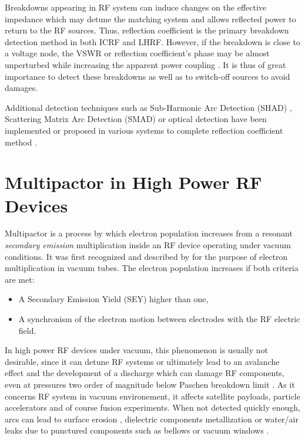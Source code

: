 Breakdowns appearing in RF system can induce changes on the effective impedance which may detune the matching system and allows reflected power to return to the RF sources. Thus, reflection coefficient is the primary breakdown detection method in both ICRF and LHRF. However, if the breakdown is close to a voltage node, the VSWR or reflection coefficient’s phase may be almost unperturbed while increasing the apparent power coupling . It is thus of great importance to detect these breakdowns as well as to switch-off sources to avoid damages. 

Additional detection techniques such as Sub-Harmonic Arc Detection (SHAD) , Scattering Matrix Arc Detection (SMAD)  or optical detection have been implemented or proposed in various systems to complete reflection coefficient method . 



\section[Multipactor in HP RF Devices]{Multipactor in High Power RF Devices}
Multipactor is a process by which electron population increases from a resonant \textit{secondary emission} multiplication inside an RF device operating under vacuum conditions. It was first recognized and described by  for the purpose of electron multiplication in vacuum tubes. The electron population increases if both criteria are met: 
\begin{itemize}
	\item A Secondary Emission Yield (SEY) higher than one,
	\item A synchronism of the electron motion between electrodes with the RF electric field.
\end{itemize}

In high power RF devices under vacuum, this phenomenon is usually not desirable, since it can detune RF systems or ultimately lead to an avalanche effect and the development of a discharge which can damage RF components, even at pressures two order of magnitude below Paschen breakdown limit . As it concerns RF system in vacuum environement, it affects satellite payloads, particle accelerators  and of course fusion experiments. When not detected quickly enough, arcs can lead to surface erosion , dielectric components metallization  or water/air leaks due to punctured components such as bellows or vacuum windows . 

